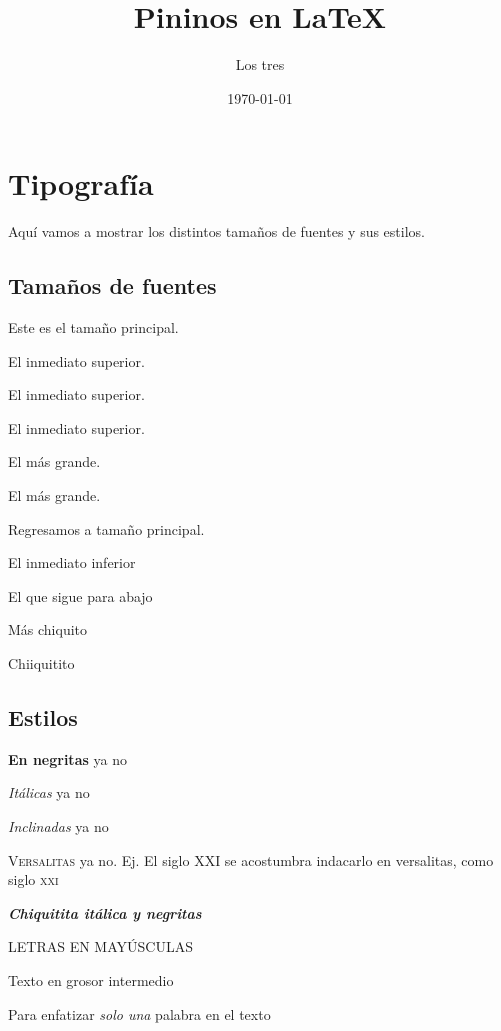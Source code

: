 \documentclass[10pt]{book}
\title{Pininos en \LaTeX}
\author{Los tres}
\date{\today}
\theoremstyle{definition}
\theoremstyle{plain}
\theoremstyle{remark}
\begin{document}
\maketitle



\tableofcontents

\chapter{Tipografía}

Aquí vamos a mostrar los distintos tamaños de fuentes y sus estilos.
\section{Tamaños de fuentes}

\normalsize Este es el tamaño principal.

{\large El inmediato superior.}

{\Large El inmediato superior.}

{\LARGE El inmediato superior.}

{\huge El más grande.}

{\Huge El más grande.}

Regresamos a tamaño principal.

{\small El inmediato inferior}

{\footnotesize El que sigue para abajo}

{\scriptsize Más chiquito}

{\tiny Chiiquitito}

\section{Estilos}

{\bfseries En negritas} ya no

{\itshape Itálicas} ya no

{\slshape Inclinadas} ya no

{\scshape Versalitas} ya no. Ej. El siglo XXI se acostumbra indacarlo en versalitas, como siglo \textsc{xxi}


{\bfseries\itshape\tiny Chiquitita itálica y negritas }

{\uppercase {Letras en mayúsculas}} %

{\mdseries Texto en grosor intermedio} %

Para enfatizar \emph{solo una} palabra en el texto %
\end{document}

